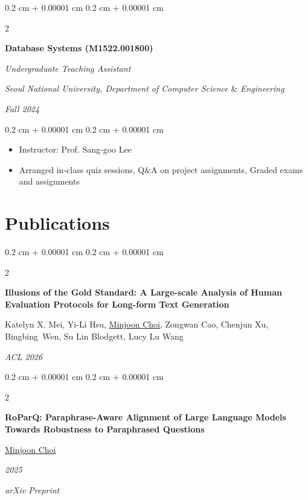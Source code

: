 \documentclass[10pt, letterpaper]{article}
\newenvironment{highlights}{
    \begin{itemize}[
        topsep=0.10 cm,
        parsep=0.10 cm,
        partopsep=0pt,
        itemsep=0pt,
        leftmargin=0.4 cm + 10pt
    ]
}{
    \end{itemize}
} %
\newenvironment{onecolentry}{
    \begin{adjustwidth}{
        0.2 cm + 0.00001 cm
    }{
        0.2 cm + 0.00001 cm
    }
}{
    \end{adjustwidth}
} %
\newenvironment{twocolentry}[2][]{
    \onecolentry
    \def\secondColumn{#2}
    \setcolumnwidth{\fill, 4.5 cm}
    \begin{paracol}{2}
}{
    \switchcolumn \raggedleft \secondColumn
    \end{paracol}
    \endonecolentry
} %
\begin{document}
        \begin{twocolentry}{
        \textit{Fall 2024}}
            \textbf{Database Systems (M1522.001800)}
            
            \textit{Undergraduate Teaching Assistant}
    
            \textit{Seoul National University,  Department of Computer Science} \& \textit{Engineering}
        \end{twocolentry}

        \vspace{0.10 cm}
        \begin{onecolentry}
            \begin{highlights}
                \item Instructor: Prof. Sang-goo Lee
                \item Arranged in-class quiz sessions, Q\&A on project assignments, Graded exams and assignments
            \end{highlights}
        \end{onecolentry}

    
    \section{Publications}
        \begin{twocolentry}{
        \textit{ACL 2026}}
            \textbf{Illusions of the Gold Standard: A Large-scale Analysis of Human Evaluation Protocols for Long-form Text Generation}

            \vspace{0.10 cm}

            Katelyn X. Mei, Yi-Li Hsu, \underline{Minjoon Choi}, Zongwan Cao, Chenjun Xu, \mbox{Bingbing Wen}, Su Lin Blodgett, Lucy Lu Wang
        \end{twocolentry}

        \vspace{0.3 cm}

        \begin{twocolentry}{
        \textit{2025}    
            
        \textit{arXiv Preprint}}
            \textbf{RoParQ: Paraphrase-Aware Alignment of Large Language Models Towards Robustness to Paraphrased Questions}

            \vspace{0.10 cm}

            \underline{Minjoon Choi}
        \end{twocolentry}
\end{document}
